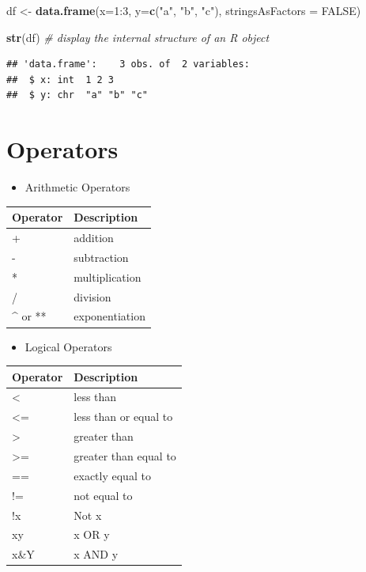 \documentclass[]{book}
\newenvironment{Shaded}{\begin{snugshade}}{\end{snugshade}}
\newcommand{\KeywordTok}[1]{\textcolor[rgb]{0.13,0.29,0.53}{\textbf{{#1}}}}
\newcommand{\DataTypeTok}[1]{\textcolor[rgb]{0.13,0.29,0.53}{{#1}}}
\newcommand{\DecValTok}[1]{\textcolor[rgb]{0.00,0.00,0.81}{{#1}}}
\newcommand{\StringTok}[1]{\textcolor[rgb]{0.31,0.60,0.02}{{#1}}}
\newcommand{\CommentTok}[1]{\textcolor[rgb]{0.56,0.35,0.01}{\textit{{#1}}}}
\newcommand{\OtherTok}[1]{\textcolor[rgb]{0.56,0.35,0.01}{{#1}}}
\newcommand{\NormalTok}[1]{{#1}}
\providecommand{\tightlist}{%
  \setlength{\itemsep}{0pt}\setlength{\parskip}{0pt}}
\begin{document}
\begin{Shaded}
\begin{Highlighting}[]
\NormalTok{df <-}\StringTok{ }\KeywordTok{data.frame}\NormalTok{(}\DataTypeTok{x=}\DecValTok{1}\NormalTok{:}\DecValTok{3}\NormalTok{, }\DataTypeTok{y=}\KeywordTok{c}\NormalTok{(}\StringTok{"a"}\NormalTok{, }\StringTok{"b"}\NormalTok{, }\StringTok{"c"}\NormalTok{), }\DataTypeTok{stringsAsFactors =} \OtherTok{FALSE}\NormalTok{)}
\end{Highlighting}
\end{Shaded}

\begin{Shaded}
\begin{Highlighting}[]
\KeywordTok{str}\NormalTok{(df) }\CommentTok{# display the internal structure of an R object}
\end{Highlighting}
\end{Shaded}

\begin{verbatim}
## 'data.frame':    3 obs. of  2 variables:
##  $ x: int  1 2 3
##  $ y: chr  "a" "b" "c"
\end{verbatim}

\section{Operators}\label{operators}

\begin{itemize}
\tightlist
\item
  Arithmetic Operators
\end{itemize}

\begin{longtable}[]{@{}ll@{}}
\toprule
Operator & Description\tabularnewline
\midrule
\endhead
+ & addition\tabularnewline
- & subtraction\tabularnewline
* & multiplication\tabularnewline
/ & division\tabularnewline
\^{} or ** & exponentiation\tabularnewline
\bottomrule
\end{longtable}

\begin{itemize}
\tightlist
\item
  Logical Operators
\end{itemize}

\begin{longtable}[]{@{}ll@{}}
\toprule
Operator & Description\tabularnewline
\midrule
\endhead
\textless{} & less than\tabularnewline
\textless{}= & less than or equal to\tabularnewline
\textgreater{} & greater than\tabularnewline
\textgreater{}= & greater than equal to\tabularnewline
== & exactly equal to\tabularnewline
!= & not equal to\tabularnewline
!x & Not x\tabularnewline
x\textbar{}y & x OR y\tabularnewline
x\&Y & x AND y\tabularnewline
\bottomrule
\end{longtable}
\end{document}
